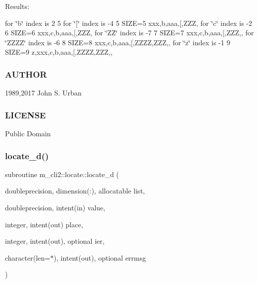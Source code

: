 Results\+:

for \char`\"{}b\char`\"{} index is 2 5 for \char`\"{}\mbox{[}\char`\"{} index is -\/4 5 S\+I\+ZE=5 xxx,b,aaa,\mbox{[},Z\+ZZ, for \char`\"{}c\char`\"{} index is -\/2 6 S\+I\+ZE=6 xxx,c,b,aaa,\mbox{[},Z\+ZZ, for \char`\"{}\+Z\+Z\char`\"{} index is -\/7 7 S\+I\+ZE=7 xxx,c,b,aaa,\mbox{[},Z\+ZZ,, for \char`\"{}\+Z\+Z\+Z\+Z\char`\"{} index is -\/6 8 S\+I\+ZE=8 xxx,c,b,aaa,\mbox{[},Z\+Z\+ZZ,Z\+ZZ,, for \char`\"{}z\char`\"{} index is -\/1 9 S\+I\+ZE=9 z,xxx,c,b,aaa,\mbox{[},Z\+Z\+ZZ,Z\+ZZ,,

\subsubsection*{A\+U\+T\+H\+OR}

1989,2017 John S. Urban \subsubsection*{L\+I\+C\+E\+N\+SE}

Public Domain \mbox{\label{interfacem__cli2_1_1locate_ac8d6a83fb2617b1a370d6f4142cfbf6b}} 
\subsubsection{\texorpdfstring{locate\+\_\+d()}{locate\_d()}}
{\footnotesize\ttfamily subroutine m\+\_\+cli2\+::locate\+::locate\+\_\+d (\begin{DoxyParamCaption}\item[{doubleprecision, dimension(\+:), allocatable}]{list,  }\item[{doubleprecision, intent(in)}]{value,  }\item[{integer, intent(out)}]{place,  }\item[{integer, intent(out), optional}]{ier,  }\item[{character(len=$\ast$), intent(out), optional}]{errmsg }\end{DoxyParamCaption})\hspace{0.3cm}{\ttfamily [private]}}

\mbox{\label{interfacem__cli2_1_1locate_a4bc5036ad18af931624efb52459bdef3}} 
